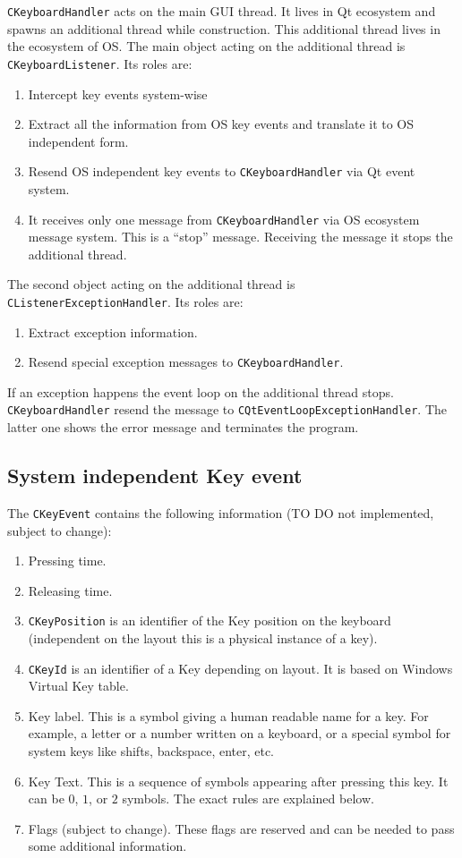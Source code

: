 \documentclass{article}
\begin{document}
\verb"CKeyboardHandler" acts on the main GUI thread. It lives in Qt ecosystem and spawns an additional thread while construction. This additional thread lives in the ecosystem of OS. The main object acting on the additional thread is \verb"CKeyboardListener". Its roles are:
\begin{enumerate}
\item Intercept key events system-wise
\item Extract all the information from OS key events and translate it to OS independent form.
\item Resend OS independent key events to \verb"CKeyboardHandler" via Qt event system.
\item It receives only one message from \verb"CKeyboardHandler" via OS ecosystem message system. This is a ``stop'' message. Receiving the message it stops the additional thread.
\end{enumerate}

The second object acting on the additional thread is \verb"CListenerExceptionHandler". Its roles are:
\begin{enumerate}
\item Extract exception information.
\item Resend special exception messages to \verb"CKeyboardHandler".
\end{enumerate}
If an exception happens the event loop on the additional thread stops. \verb"CKeyboardHandler" resend the message to \verb"CQtEventLoopExceptionHandler". The latter one shows the error message and terminates the program.

\subsection{System independent Key event}

The \verb"CKeyEvent" contains the following information (TO DO not implemented, subject to change):
\begin{enumerate}
\item Pressing time.
\item Releasing time.
\item \verb"CKeyPosition" is an identifier of the Key position on the keyboard (independent on the layout this is a physical instance of a key).
\item \verb"CKeyId" is an identifier of a Key depending on layout. It is based on Windows Virtual Key table.
\item Key label. This is a symbol giving a human readable name for a key. For example, a letter or a number written on a keyboard, or a special symbol for system keys like shifts, backspace, enter, etc.
\item Key Text. This is a sequence of symbols appearing after pressing this key. It can be $0$, $1$, or $2$ symbols. The exact rules are explained below.
\item Flags (subject to change). These flags are reserved and can be needed to pass some additional information.
\end{enumerate}
\end{document}
